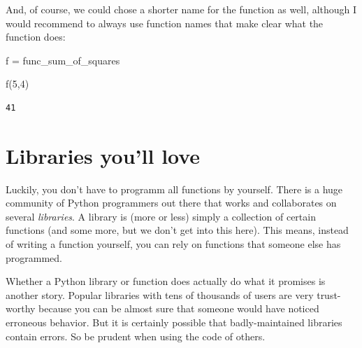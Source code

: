 \documentclass[
  a4paperpaper,
  ,captions=tableheading
]{scrbook}
\newenvironment{Shaded}{\begin{snugshade}}{\end{snugshade}}
\newcommand{\DecValTok}[1]{\textcolor[rgb]{0.68,0.00,0.00}{#1}}
\newcommand{\NormalTok}[1]{\textcolor[rgb]{0.00,0.23,0.31}{#1}}
\newcommand{\OperatorTok}[1]{\textcolor[rgb]{0.37,0.37,0.37}{#1}}
\begin{document}
And, of course, we could chose a shorter name for the function as well,
although I would recommend to always use function names that make clear
what the function does:

\begin{Shaded}
\begin{Highlighting}[]
\NormalTok{f }\OperatorTok{=}\NormalTok{ func\_sum\_of\_squares}

\NormalTok{f(}\DecValTok{5}\NormalTok{,}\DecValTok{4}\NormalTok{)}
\end{Highlighting}
\end{Shaded}

\begin{verbatim}
41
\end{verbatim}

\hypertarget{libraries-youll-love}{%
\section{Libraries you'll love}\label{libraries-youll-love}}

Luckily, you don't have to programm all functions by yourself. There is
a huge community of Python programmers out there that works and
collaborates on several \emph{libraries}. A library is (more or less)
simply a collection of certain functions (and some more, but we don't
get into this here). This means, instead of writing a function yourself,
you can rely on functions that someone else has programmed.

\begin{tcolorbox}[enhanced jigsaw, arc=.35mm, colbacktitle=quarto-callout-caution-color!10!white, colback=white, breakable, toprule=.15mm, title=\textcolor{quarto-callout-caution-color}{\faFire}\hspace{0.5em}{Caution}, left=2mm, bottomtitle=1mm, toptitle=1mm, leftrule=.75mm, opacitybacktitle=0.6, titlerule=0mm, opacityback=0, rightrule=.15mm, bottomrule=.15mm, coltitle=black, colframe=quarto-callout-caution-color-frame]

Whether a Python library or function does actually do what it promises
is another story. Popular libraries with tens of thousands of users are
very trust-worthy because you can be almost sure that someone would have
noticed erroneous behavior. But it is certainly possible that
badly-maintained libraries contain errors. So be prudent when using the
code of others.

\end{tcolorbox}
\end{document}
